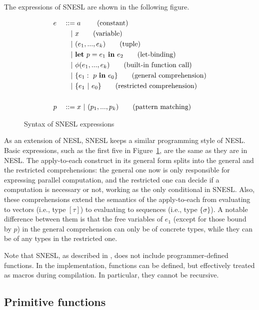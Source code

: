 The expressions of SNESL are shown in the following figure.

\begin{figure}[H]\large 
\begin{alignat*}{2}
& e &&::=  a \     \tag{constant} \\
&   && \quad | \ x  \tag{variable} \\
&   && \quad | \ (e_1,...,e_k) \tag{tuple}\\
&   && \quad | \ \mathbf{let} \ p = e_1 \ \mathbf{in} \ e_2 \tag{let-binding}\\
&   && \quad | \ \phi{(e_1,...,e_k)}  \tag{built-in function call} \\
&   && \quad | \ \{e_1: \ p \ \mathbf{in} \ e_0 \} \tag{general comprehension} \\
&   && \quad | \ \{e_1 \ | \ e_0 \}\tag {restricted comprehension} \\
\\
& p &&:: = x \ | \ (p_1,...,p_k)  \tag{pattern matching}
\end{alignat*}
\caption{Syntax of SNESL expressions \label{fig-snesl-exps}}
\end{figure}

As an extension of NESL, SNESL keeps a similar programming style of NESL. 
Basic expressions, such as the first five in Figure~\ref{fig-snesl-exps}, are the same as they are in NESL. 
The apply-to-each construct in its general form splits into the general and the restricted comprehensions:
the general one now is only responsible for expressing parallel computation,
and the restricted one can decide if a computation is necessary or not, working as the only conditional in SNESL.
Also, these comprehensions extend the semantics of the apply-to-each from evaluating to vectors (i.e., type $[\tau]$) to evaluating to sequences (i.e., type $\{\sigma\}$). 
A notable difference between them is that the free variables of $e_1$ (except for those bound by $p$) in the general comprehension can only be of concrete types, while they can be of any types in the restricted one.

Note that SNESL, as described in \cite{Fphd}, does not include programmer-defined functions. 
In the implementation, functions can be defined, but effectively treated as macros during compilation.
In particular, they cannot be recursive.

\subsection{Primitive functions}

